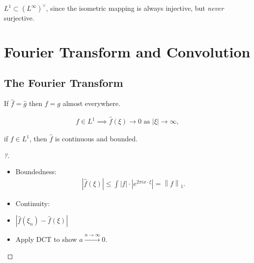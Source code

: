 \begin{proposition}

\(L^1 \subset (L^\infty)^\vee\), since the isometric mapping is always
injective, but \emph{never} surjective.

\end{proposition}

\hypertarget{fourier-transform-and-convolution}{%
\section{Fourier Transform and
Convolution}\label{fourier-transform-and-convolution}}

\hypertarget{the-fourier-transform}{%
\subsection{The Fourier Transform}\label{the-fourier-transform}}

\begin{proposition}[?]

If \(\widehat{f} = \widehat{g}\) then \(f=g\) almost everywhere.

\end{proposition}

\begin{proposition}

\begin{align*}
f\in L^1 \implies
\widehat{f}(\xi) \rightarrow 0 \text { as }|\xi| \rightarrow \infty
,\end{align*}

if \(f \in L^1\), then \(\widehat{f}\) is continuous and bounded.

\end{proposition}

\begin{proof}[?]

\envlist

\begin{itemize}
\item
  Boundedness:
  \begin{align*}
  {\left\lvert {\widehat{f}(\xi)} \right\rvert} 
  \leq \int {\left\lvert {f} \right\rvert}\cdot {\left\lvert {e^{2\pi i x\cdot \xi }} \right\rvert} 
  = {\left\lVert {f} \right\rVert}_{1}
  .\end{align*}
\item
  Continuity:
\item
  \({\left\lvert {\widehat{f}(\xi_{n}) - \widehat{f} (\xi) } \right\rvert}\)
\item
  Apply DCT to show \(a\overset{n\to\infty}\to 0\).
\end{itemize}

\end{proof}

